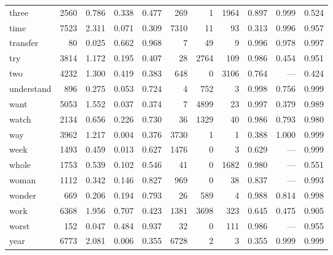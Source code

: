 \begin{landscape}
\begin{longtable}[c]{ l | r r c c | r r r | r r r }
  three      & 2560  & 0.786                   & 0.338           & 0.477      & 269       & 1           & 1964         & 0.897     & 0.999       & 0.524\\
  time       & 7523  & 2.311                   & 0.071           & 0.309      & 7310      & 11          & 93           & 0.313     & 0.996       & 0.957\\
  transfer   & 80    & 0.025                   & 0.662           & 0.968      & 7         & 49          & 9            & 0.996     & 0.978       & 0.997\\
  try        & 3814  & 1.172                   & 0.195           & 0.407      & 28        & 2764        & 109          & 0.986     & 0.454       & 0.951\\
  two        & 4232  & 1.300                   & 0.419           & 0.383      & 648       & 0           & 3106         & 0.764     & —           & 0.424\\
  understand & 896   & 0.275                   & 0.053           & 0.724      & 4         & 752         & 3            & 0.998     & 0.756       & 0.999\\
  want       & 5053  & 1.552                   & 0.037           & 0.374      & 7         & 4899        & 23           & 0.997     & 0.379       & 0.989\\
  watch      & 2134  & 0.656                   & 0.226           & 0.730      & 36        & 1329        & 40           & 0.986     & 0.793       & 0.980\\
  way        & 3962  & 1.217                   & 0.004           & 0.376      & 3730      & 1           & 1            & 0.388     & 1.000       & 0.999\\
  week       & 1493  & 0.459                   & 0.013           & 0.627      & 1476      & 0           & 3            & 0.629     & —           & 0.999\\
  whole      & 1753  & 0.539                   & 0.102           & 0.546      & 41        & 0           & 1682         & 0.980     & —           & 0.551\\
  woman      & 1112  & 0.342                   & 0.146           & 0.827      & 969       & 0           & 38           & 0.837     & —           & 0.993\\
  wonder     & 669   & 0.206                   & 0.194           & 0.793      & 26        & 589         & 4            & 0.988     & 0.814       & 0.998\\
  work       & 6368  & 1.956                   & 0.707           & 0.423      & 1381      & 3698        & 323          & 0.645     & 0.475       & 0.905\\
  worst      & 152   & 0.047                   & 0.484           & 0.937      & 32        & 0           & 111          & 0.986     & —           & 0.955\\
  year       & 6773  & 2.081                   & 0.006           & 0.355      & 6728      & 2           & 3            & 0.355     & 0.999       & 0.999\\


\end{longtable}
\end{landscape}
